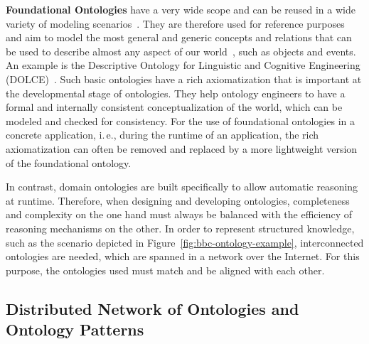 \documentclass[a4paper,USenglish]{tgdk-v2021}
\begin{document}
\textbf{Foundational Ontologies} have a very wide scope and can be reused in a wide variety of modeling scenarios~\cite{BorgoMasoloDOLCE2009}. 
They are therefore used for reference purposes~\cite{OberleMiddleware2006} and aim to model the most general and generic concepts and relations that can be used to describe almost any aspect of our world~\cite{BorgoMasoloDOLCE2009,OberleMiddleware2006}, such as objects and events.
An example is the Descriptive Ontology for Linguistic and Cognitive Engineering (DOLCE)~\cite{BorgoMasoloDOLCE2009}.
Such basic ontologies have a rich axiomatization that is important at the developmental stage of ontologies.
They help ontology engineers to have a formal and internally consistent conceptualization of the world, which can be modeled and checked for consistency.
For the use of foundational ontologies in a concrete application, i.\,e., during the runtime of an application, the rich axiomatization can often be removed and replaced by a more lightweight version of the foundational ontology.

In contrast, domain ontologies are built specifically to allow automatic reasoning at runtime.
Therefore, when designing and developing ontologies, completeness and complexity on the one hand must always be balanced with the efficiency of reasoning mechanisms on the other.
In order to represent structured knowledge, such as the scenario depicted in Figure~\ref{fig:bbc-ontology-example}, interconnected ontologies are needed, which are spanned in a network over the Internet. 
For this purpose, the ontologies used must match and be aligned with each other.

\subsection{Distributed Network of Ontologies and Ontology Patterns}
\end{document}
